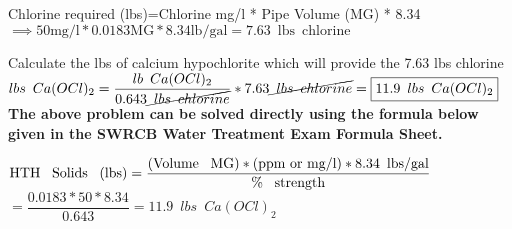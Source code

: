 \documentclass{article}
\begin{document}
\begin{enumerate}
\begin{figure}[h!]
\end{figure}
\vspace{0.2cm}

Chlorine required (lbs)=Chlorine mg/l * Pipe Volume (MG) * 8.34\\
\vspace{0.2cm}
$\implies 50 \mathrm{mg} / \mathrm{l} * 0.0183 \mathrm{MG} * 8.34 \mathrm{lb} / \mathrm{gal}=\boxed{7.63 \mathrm{\enspace lbs \enspace chlorine}}$\\
\vspace{0.2cm}

Calculate the lbs of calcium hypochlorite which will provide the 7.63 lbs chlorine\\
$lbs \enspace Ca(OCl)_2=\dfrac{lb \enspace Ca(OCl)_2}{0.643 \cancel{\enspace lbs \enspace chlorine}}*7.63 \cancel{\enspace lbs \enspace chlorine}=\boxed{11.9 \enspace lbs \enspace Ca(OCl)_2}$
\textbf{The above problem can be solved directly using the formula below given in the SWRCB Water Treatment Exam Formula Sheet.}\\
\vspace{0.3cm}

 $\textrm{HTH \enspace Solids \enspace (lbs)}=\dfrac{\textrm{(Volume \enspace MG)}*\textrm{(ppm or mg/l)}*8.34 \enspace \textrm{lbs/gal}}{\textrm{\% \enspace strength}}$\\
 \hspace{3cm} $=\dfrac{0.0183*50*8.34}{0.643}=\boxed{11.9 \enspace lbs \enspace Ca(OCl)_2}$ 

\end{enumerate}
\end{document}
